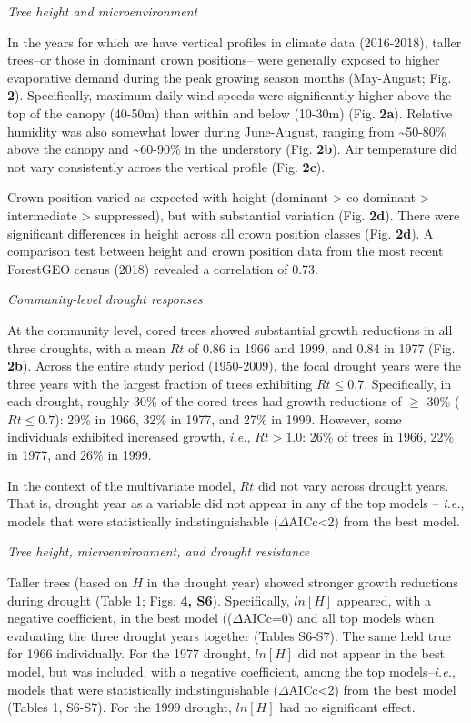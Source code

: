 \documentclass[
]{article}
\begin{document}
\emph{Tree height and microenvironment}

In the years for which we have vertical profiles in climate data
(2016-2018), taller trees--or those in dominant crown positions-- were
generally exposed to higher evaporative demand during the peak growing
season months (May-August; Fig. \textbf{2}). Specifically, maximum daily
wind speeds were significantly higher above the top of the canopy
(40-50m) than within and below (10-30m) (Fig. \textbf{2a}). Relative
humidity was also somewhat lower during June-August, ranging from
\textasciitilde50-80\% above the canopy and \textasciitilde60-90\% in
the understory (Fig. \textbf{2b}). Air temperature did not vary
consistently across the vertical profile (Fig. \textbf{2c}).

Crown position varied as expected with height (dominant \textgreater{}
co-dominant \textgreater{} intermediate \textgreater{} suppressed), but
with substantial variation (Fig. \textbf{2d}). There were significant
differences in height across all crown position classes (Fig.
\textbf{2d}). A comparison test between height and crown position data
from the most recent ForestGEO census (2018) revealed a correlation of
0.73.

\emph{Community-level drought responses}

At the community level, cored trees showed substantial growth reductions
in all three droughts, with a mean \(Rt\) of 0.86 in 1966 and 1999, and
0.84 in 1977 (Fig. \textbf{2b}). Across the entire study period
(1950-2009), the focal drought years were the three years with the
largest fraction of trees exhibiting \(Rt \le 0.7\). Specifically, in
each drought, roughly 30\% of the cored trees had growth reductions of
\(\ge\) 30\% (\(Rt \le 0.7\)): 29\% in 1966, 32\% in 1977, and 27\% in
1999. However, some individuals exhibited increased growth, \emph{i.e.},
\(Rt > 1.0\): 26\% of trees in 1966, 22\% in 1977, and 26\% in 1999.

In the context of the multivariate model, \(Rt\) did not vary across
drought years. That is, drought year as a variable did not appear in any
of the top models -- \emph{i.e.}, models that were statistically
indistinguishable (\(\Delta\)AICc\textless2) from the best model.

\emph{Tree height, microenvironment, and drought resistance}

Taller trees (based on \(H\) in the drought year) showed stronger growth
reductions during drought (Table 1; Figs. \textbf{4, S6}). Specifically,
\(ln[H]\) appeared, with a negative coefficient, in the best model
((\(\Delta\)AICc=0) and all top models when evaluating the three drought
years together (Tables S6-S7). The same held true for 1966 individually.
For the 1977 drought, \(ln[H]\) did not appear in the best model, but
was included, with a negative coefficient, among the top
models--\emph{i.e.}, models that were statistically indistinguishable
(\(\Delta\)AICc\textless2) from the best model (Tables 1, S6-S7). For
the 1999 drought, \(ln[H]\) had no significant effect.
\end{document}
